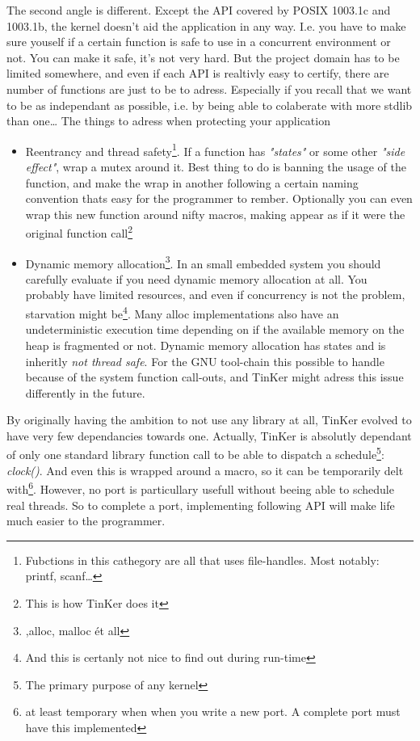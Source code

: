 The second angle is different. Except the API covered by POSIX 1003.1c and 1003.1b, the kernel doesn't aid the application in any way. I.e. you have to make sure youself if a certain function is safe to use in a concurrent environment or not. You can make it safe, it's not very hard. But the project domain has to be limited somewhere, and even if each API is realtivly easy to certify, there are number of functions are just to be to adress. Especially if you recall that we want to be as independant as possible, i.e. by being able to colaberate with more stdlib than one\ldots
The things to adress when protecting your application
\begin{itemize}
	\item Reentrancy and thread safety\footnote{Fubctions in this cathegory are all that uses file-handles. Most notably: printf, scanf\ldots}. If a function has \textit{"states"} or some other \textit{"side effect"}, wrap a mutex around it. Best thing to do is banning the usage of the function, and make the wrap in another following a certain naming convention thats easy for the programmer to rember. Optionally you can even wrap this new function around nifty macros, making appear as if it were the original function call\footnote{This is how TinKer does it}
	\item Dynamic memory allocation\footnote{,alloc, malloc \'et all}. In an small embedded system you should carefully evaluate if you need dynamic memory allocation at all. You probably have limited resources, and even if concurrency is not the problem, starvation might be\footnote{And this is certanly not nice to find out during run-time}. Many alloc implementations also have an undeterministic execution time depending on if the available memory on the heap is fragmented or not. Dynamic memory allocation has states and is inheritly \textit{not thread safe}. For the GNU tool-chain this possible to handle because of the system function call-outs, and TinKer might adress this issue differently in the future.
\end{itemize}
By originally having the ambition to not use any library at all, TinKer evolved to have very few dependancies towards one. Actually, TinKer is absolutly dependant of only one standard library function call to be able to dispatch a schedule\footnote{The primary purpose of any kernel}: \textit{clock()}. And even this is wrapped around a macro, so it can be temporarily delt with\footnote{at least temporary when when you write a new port. A complete port must have this implemented}. However, no port is particullary usefull without beeing able to schedule real threads. So to complete a port, implementing following API will make life much easier to the programmer.

